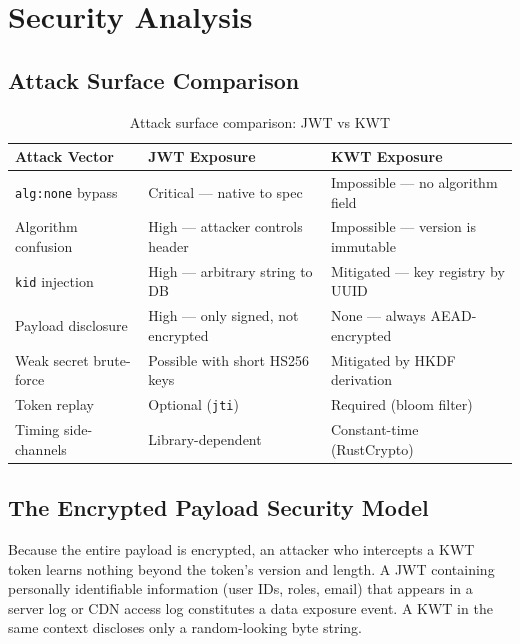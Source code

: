\documentclass[11pt, letterpaper]{article}
\begin{document}
\section{Security Analysis}

\subsection{Attack Surface Comparison}

\begin{table}[H]
\centering
\caption{Attack surface comparison: JWT vs KWT}
\small
\begin{tabularx}{\linewidth}{L{3.2cm} L{5.0cm} X}
\toprule
{}
\color{white}\textbf{Attack Vector} &
\color{white}\textbf{JWT Exposure} &
\color{white}\textbf{KWT Exposure} \\
\midrule
\texttt{alg:none} bypass    & Critical — native to spec        & Impossible — no algorithm field \\
Algorithm confusion         & High — attacker controls header  & Impossible — version is immutable \\
\texttt{kid} injection      & High — arbitrary string to DB    & Mitigated — key registry by UUID \\
Payload disclosure          & High — only signed, not encrypted & None — always AEAD-encrypted \\
Weak secret brute-force     & Possible with short HS256 keys   & Mitigated by HKDF derivation \\
Token replay                & Optional (\texttt{jti})          & Required (bloom filter) \\
Timing side-channels        & Library-dependent                & Constant-time (RustCrypto) \\
\bottomrule
\end{tabularx}
\end{table}

\subsection{The Encrypted Payload Security Model}

Because the entire payload is encrypted, an attacker who intercepts a KWT
token learns nothing beyond the token's version and length. A JWT containing
personally identifiable information (user IDs, roles, email) that appears in
a server log or CDN access log constitutes a data exposure event. A KWT in
the same context discloses only a random-looking byte string.
\end{document}
